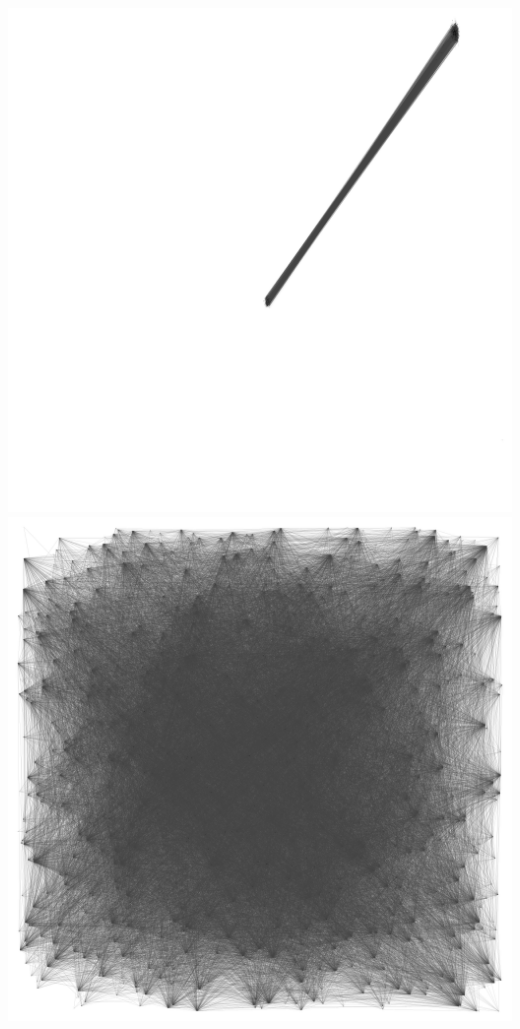 \documentclass[12pt, a4paper]{article}
\begin{document}
\begin{multicols}{2}
  {\centering
  \includegraphics[width=\columnwidth]{src/youtube/hdg/comp/7_plot_drl}\\
  \label{fig:hdg_c7}}
  {\centering
  \includegraphics[width=\columnwidth]{src/youtube/hdg/comp/8_plot_random}\\
  \label{fig:hdg_c8}}
\end{multicols}
\end{document}
